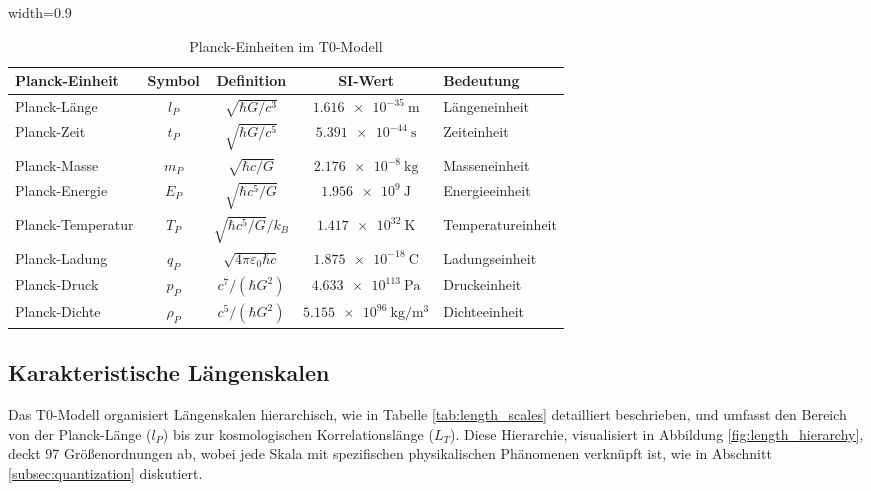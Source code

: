 \documentclass[12pt,a4paper]{article}
\newcommand{\tablescale}{0.9}
\begin{document}
	\begin{table}[htbp]
		\centering
		\begin{adjustbox}{width=\tablescale\textwidth}
			\begin{tabular}{lcccl}
				\toprule
				\textbf{Planck-Einheit} & \textbf{Symbol} & \textbf{Definition} & \textbf{SI-Wert} & \textbf{Bedeutung} \\
				\midrule
				Planck-Länge & \(l_P\) & \(\sqrt{\hbar G/c^3}\) & \(\SI{1.616e-35}{\meter}\) & Längeneinheit \\
				Planck-Zeit & \(t_P\) & \(\sqrt{\hbar G/c^5}\) & \(\SI{5.391e-44}{\second}\) & Zeiteinheit \\
				Planck-Masse & \(m_P\) & \(\sqrt{\hbar c/G}\) & \(\SI{2.176e-8}{\kilogram}\) & Masseneinheit \\
				Planck-Energie & \(E_P\) & \(\sqrt{\hbar c^5/G}\) & \(\SI{1.956e9}{\joule}\) & Energieeinheit \\
				Planck-Temperatur & \(T_P\) & \(\sqrt{\hbar c^5/G}/k_B\) & \(\SI{1.417e32}{\kelvin}\) & Temperatureinheit \\
				Planck-Ladung & \(q_P\) & \(\sqrt{4\pi \varepsilon_0 \hbar c}\) & \(\SI{1.875e-18}{\coulomb}\) & Ladungseinheit \\
				Planck-Druck & \(p_P\) & \(c^7/(\hbar G^2)\) & \(\SI{4.633e113}{\pascal}\) & Druckeinheit \\
				Planck-Dichte & \(\rho_P\) & \(c^5/(\hbar G^2)\) & \(\SI{5.155e96}{\kilogram\per\meter\cubed}\) & Dichteeinheit \\
				\bottomrule
			\end{tabular}
		\end{adjustbox}
		\caption{Planck-Einheiten im T0-Modell}
		\label{tab:planck_units}
	\end{table}
	
	\subsection{Karakteristische Längenskalen}
	\label{sec:length_scales}
	
	Das T0-Modell organisiert Längenskalen hierarchisch, wie in Tabelle \ref{tab:length_scales} detailliert beschrieben, und umfasst den Bereich von der Planck-Länge (\(l_P\)) bis zur kosmologischen Korrelationslänge (\(L_T\)). Diese Hierarchie, visualisiert in Abbildung \ref{fig:length_hierarchy}, deckt 97 Größenordnungen ab, wobei jede Skala mit spezifischen physikalischen Phänomenen verknüpft ist, wie in Abschnitt \ref{subsec:quantization} diskutiert.
	
\end{document}
